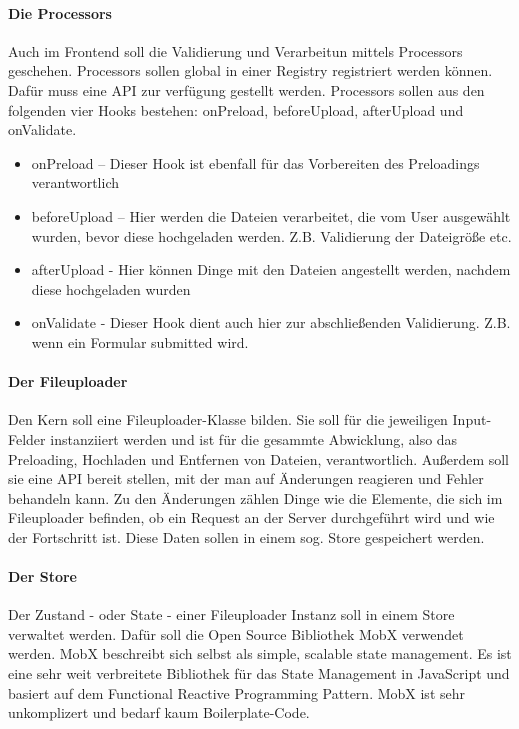 \paragraph{Die Processors} Auch im Frontend soll die Validierung und Verarbeitun mittels Processors geschehen. Processors sollen global in einer Registry registriert werden können. Dafür muss eine API zur verfügung gestellt werden. Processors sollen aus den folgenden vier Hooks bestehen: onPreload, beforeUpload, afterUpload und onValidate.

\begin{itemize}
	\item onPreload 	– Dieser Hook ist ebenfall für das Vorbereiten des Preloadings verantwortlich
	\item beforeUpload 	– Hier werden die Dateien verarbeitet, die vom User ausgewählt wurden, bevor diese hochgeladen werden. Z.B. Validierung der Dateigröße etc.
	\item afterUpload 	- Hier können Dinge mit den Dateien angestellt werden, nachdem diese hochgeladen wurden
	\item onValidate	- Dieser Hook dient auch hier zur abschließenden Validierung. Z.B. wenn ein Formular submitted wird.
\end{itemize}

\paragraph{Der Fileuploader} Den Kern soll eine Fileuploader-Klasse bilden. Sie soll für die jeweiligen Input-Felder instanziiert werden und ist für die gesammte Abwicklung, also das Preloading, Hochladen und Entfernen von Dateien, verantwortlich. Außerdem soll sie eine API bereit stellen, mit der man auf Änderungen reagieren und Fehler behandeln kann. Zu den Änderungen zählen Dinge wie die Elemente, die sich im Fileuploader befinden, ob ein Request an der Server durchgeführt wird und wie der Fortschritt ist. Diese Daten sollen in einem sog. Store gespeichert werden.

\paragraph{Der Store} Der Zustand - oder State - einer Fileuploader Instanz soll in einem Store verwaltet werden. Dafür soll die Open Source Bibliothek MobX verwendet werden. MobX beschreibt sich selbst als \glqq simple, scalable state management\grqq{}. Es ist eine sehr weit verbreitete Bibliothek für das State Management in JavaScript und basiert auf dem Functional Reactive Programming Pattern. MobX ist sehr unkomplizert und bedarf kaum Boilerplate-Code.

